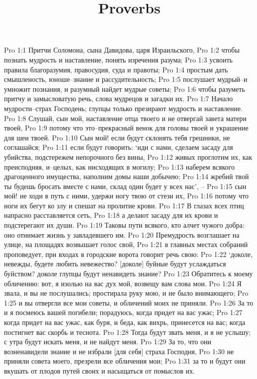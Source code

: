 

\title{Proverbs}

Pro 1:1  Притчи Соломона, сына Давидова, царя Израильского,
Pro 1:2  чтобы познать мудрость и наставление, понять изречения разума;
Pro 1:3  усвоить правила благоразумия, правосудия, суда и правоты;
Pro 1:4  простым дать смышленость, юноше--знание и рассудительность;
Pro 1:5  послушает мудрый--и умножит познания, и разумный найдет мудрые советы;
Pro 1:6  чтобы разуметь притчу и замысловатую речь, слова мудрецов и загадки их.
Pro 1:7  Начало мудрости--страх Господень; глупцы только презирают мудрость и наставление.
Pro 1:8  Слушай, сын мой, наставление отца твоего и не отвергай завета матери твоей,
Pro 1:9  потому что это--прекрасный венок для головы твоей и украшение для шеи твоей.
Pro 1:10  Сын мой! если будут склонять тебя грешники, не соглашайся;
Pro 1:11  если будут говорить: `иди с нами, сделаем засаду для убийства, подстережем непорочного без вины,
Pro 1:12  живых проглотим их, как преисподняя, и--целых, как нисходящих в могилу;
Pro 1:13  наберем всякого драгоценного имущества, наполним домы наши добычею;
Pro 1:14  жребий твой ты будешь бросать вместе с нами, склад один будет у всех нас', --
Pro 1:15  сын мой! не ходи в путь с ними, удержи ногу твою от стези их,
Pro 1:16  потому что ноги их бегут ко злу и спешат на пролитие крови.
Pro 1:17  В глазах всех птиц напрасно расставляется сеть,
Pro 1:18  а делают засаду для их крови и подстерегают их души.
Pro 1:19  Таковы пути всякого, кто алчет чужого добра: оно отнимает жизнь у завладевшего им.
Pro 1:20  Премудрость возглашает на улице, на площадях возвышает голос свой,
Pro 1:21  в главных местах собраний проповедует, при входах в городские ворота говорит речь свою:
Pro 1:22  `доколе, невежды, будете любить невежество? [доколе] буйные будут услаждаться буйством? доколе глупцы будут ненавидеть знание?
Pro 1:23  Обратитесь к моему обличению: вот, я изолью на вас дух мой, возвещу вам слова мои.
Pro 1:24  Я звала, и вы не послушались; простирала руку мою, и не было внимающего;
Pro 1:25  и вы отвергли все мои советы, и обличений моих не приняли.
Pro 1:26  За то и я посмеюсь вашей погибели; порадуюсь, когда придет на вас ужас;
Pro 1:27  когда придет на вас ужас, как буря, и беда, как вихрь, принесется на вас; когда постигнет вас скорбь и теснота.
Pro 1:28  Тогда будут звать меня, и я не услышу; с утра будут искать меня, и не найдут меня.
Pro 1:29  За то, что они возненавидели знание и не избрали [для себя] страха Господня,
Pro 1:30  не приняли совета моего, презрели все обличения мои;
Pro 1:31  за то и будут они вкушать от плодов путей своих и насыщаться от помыслов их.
